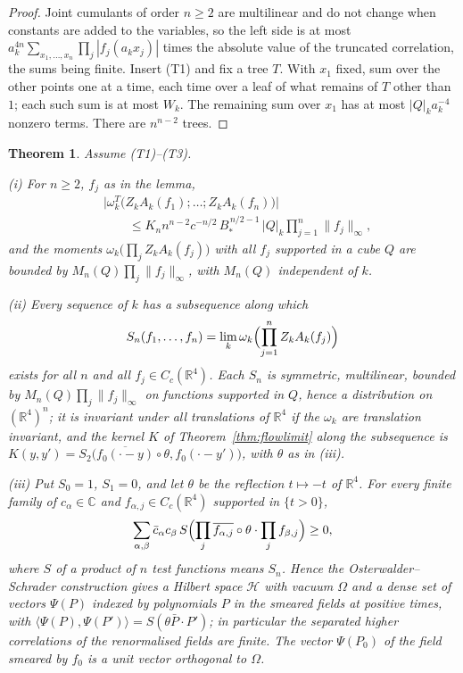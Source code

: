 \documentclass[aps,prd,twocolumn,superscriptaddress,nofootinbib,longbibliography,floatfix,amsmath,amssymb,10pt]{revtex4-2}
\newtheorem{theorem}{Theorem}
\theoremstyle{definition}
\theoremstyle{remark}
\newcommand{\R}{\mathbb{R}}
\newcommand{\C}{\mathbb{C}}
\newcommand{\ip}[2]{\langle #1,#2\rangle}
\begin{document}
\begin{proof}
Joint cumulants of order $n\ge2$ are multilinear and do not change when
constants are added to the variables, so the left side is at most
$a_k^{4n}\sum_{x_1,\dots,x_n}\prod_j|f_j(a_kx_j)|$ times the absolute value
of the truncated correlation, the sums being finite. Insert (T1) and fix a
tree $T$. With $x_1$ fixed, sum over the other points one at a time, each
time over a leaf of what remains of $T$ other than $1$; each such sum is at
most $W_k$. The remaining sum over $x_1$ has at most $|Q|_ka_k^{-4}$ nonzero
terms. There are $n^{n-2}$ trees.
\end{proof}

\begin{theorem}\label{thm:higher}
Assume \textup{(T1)--(T3)}.

\textup{(i)} For $n\ge2$, $f_j$ as in the lemma,
\[
\begin{split}
&\bigl|\omega^T_k\bigl(Z_kA_k(f_1);\dots;Z_kA_k(f_n)\bigr)\bigr|\\
&\qquad\le K_nn^{n-2}c^{-n/2}\,B_*^{\,n/2-1}\,|Q|_k\prod_{j=1}^n\|f_j\|_\infty ,
\end{split}
\]
and the moments $\omega_k\bigl(\prod_jZ_kA_k(f_j)\bigr)$ with all
$f_j$ supported in a cube $Q$ are bounded by $M_n(Q)\prod_j\|f_j\|_\infty$,
with $M_n(Q)$ independent of $k$.

\textup{(ii)} Every sequence of $k$ has a subsequence along which
\[
S_n(f_1,\dots,f_n)=\lim_k\omega_k\Bigl(\prod_{j=1}^nZ_kA_k(f_j)\Bigr)
\]
exists for all $n$ and all $f_j\in C_c(\R^4)$. Each $S_n$ is symmetric,
multilinear, bounded by $M_n(Q)\prod_j\|f_j\|_\infty$ on functions supported in
$Q$, hence a distribution on $(\R^4)^n$; it is invariant under all
translations of $\R^4$ if the $\omega_k$ are translation invariant, and the
kernel $K$ of Theorem~\textup{\ref{thm:flowlimit}} along the subsequence is
$K(y,y')=S_2\bigl(\overline{f_0(\cdot-y)}\circ\theta,f_0(\cdot-y')\bigr)$, with
$\theta$ as in \textup{(iii)}.

\textup{(iii)} Put $S_0=1$, $S_1=0$, and let $\theta$ be the reflection
$t\mapsto-t$ of $\R^4$. For every finite family of $c_\alpha\in\C$ and
$f_{\alpha,j}\in C_c(\R^4)$ supported in $\{t>0\}$,
\[
\sum_{\alpha,\beta}\bar c_\alpha c_\beta\,
S\Bigl(\prod_j\overline{f_{\alpha,j}}\circ\theta\cdot\prod_jf_{\beta,j}\Bigr)\ge0,
\]
where $S$ of a product of $n$ test functions means $S_n$. Hence the
Osterwalder--Schrader construction gives a Hilbert space $\mathcal H$ with
vacuum $\Omega$ and a dense set of vectors $\Psi(P)$ indexed by polynomials $P$
in the smeared fields at positive times, with
$\ip{\Psi(P)}{\Psi(P')}=S(\theta\bar P\cdot P')$; in particular the separated
higher correlations of the renormalised fields are finite. The vector
$\Psi(P_0)$ of the field smeared by $f_0$ is a unit vector orthogonal to
$\Omega$.


\end{theorem}
\end{document}
